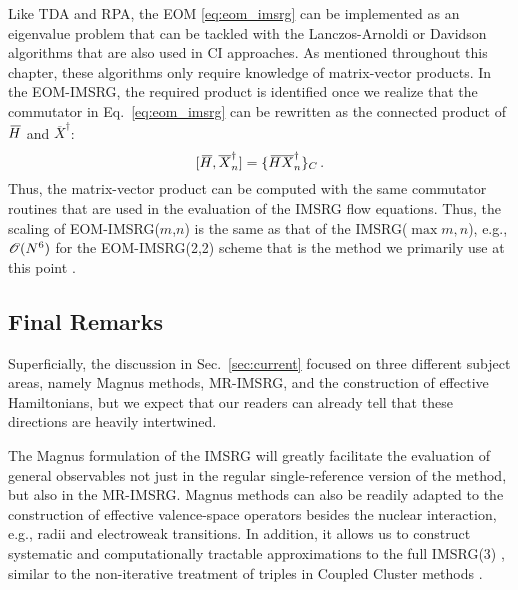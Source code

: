 Like TDA and RPA, the EOM \eqref{eq:eom_imsrg} can be implemented as an eigenvalue 
problem that can be tackled with the Lanczos-Arnoldi or Davidson algorithms 
\cite{Lanczos:1950sp,Arnoldi:1951kk,Davidson:1989pi} that are also used in CI
approaches. As mentioned throughout this chapter, these algorithms only require
knowledge of matrix-vector products. In the EOM-IMSRG, the required product is
identified once we realize that the commutator in Eq.~\eqref{eq:eom_imsrg} can
be rewritten as the connected product of $\mkern 3mu\overline{\mkern-3muH}$ and $\overline{X}^\dag$:
\begin{equation}\label{eq:mat_vec_prod}
  \comm{\Hfinal}{\overline{X}^\dag_n} = \{\Hfinal\overline{X}^\dag_n\}_C\,.
\end{equation}
Thus, the matrix-vector product can be computed with the same commutator routines 
that are used in the evaluation of the IMSRG flow equations. Thus, the scaling of
EOM-IMSRG($m$,$n$) is the same as that of the IMSRG($\max{m,n}$), e.g., $\mathcal{O}(N^6)$
for the EOM-IMSRG(2,2) scheme that is the method we primarily use at this point 
\cite{Parzuchowski:2016pi}. 


\subsection{\label{sec:current_remarks}Final Remarks}
Superficially, the discussion in Sec.~\ref{sec:current} focused on 
three different subject areas, namely Magnus methods, MR-IMSRG, and the 
construction of effective Hamiltonians, but we expect that our readers
can already tell that these directions are heavily intertwined. 

The Magnus formulation of the IMSRG will greatly facilitate the evaluation 
of general observables not just in the regular single-reference version of
the method, but also in the MR-IMSRG. Magnus methods can also be readily 
adapted to the construction of effective valence-space operators besides 
the nuclear interaction, e.g., radii and electroweak transitions. In addition, 
it allows us to construct systematic and computationally tractable approximations 
to the full IMSRG(3) \cite{Morris:2016xp,Parzuchowski:2016pi}, similar to 
the non-iterative treatment of triples in Coupled Cluster methods 
\cite{Taube:2008kx,Taube:2008vn,Piecuch:2005dp,Binder:2013fk}.

